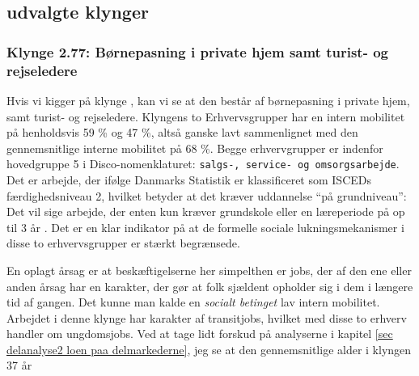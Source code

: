 %
\subsection{udvalgte klynger \label{subsec zoom within.mob}}
%



\subsubsection{Klynge 2.77: Børnepasning i private hjem samt turist- og rejseledere \label{subsubsec zoom 2.77 within.mob}}

Hvis vi kigger på klynge , kan vi se at den består af børnepasning i private hjem, samt turist- og rejseledere. Klyngens to Erhvervsgrupper har en intern mobilitet på henholdsvis  59 \% og 47 \%, altså ganske lavt sammenlignet med den gennemsnitlige interne mobilitet på 68 \%.  Begge erhvervgrupper er indenfor hovedgruppe 5 i Disco-nomenklaturet: \texttt{salgs-, service- og omsorgsarbejde}. Det er arbejde, der ifølge Danmarks Statistik er klassificeret som ISCEDs færdighedsniveau 2, hvilket betyder at det kræver uddannelse “på grundniveau”: Det vil sige arbejde, der enten kun kræver grundskole eller en læreperiode på op til 3 år \parencite[tabel 1]{DSTDISCO88}. Det er en klar indikator på at de formelle sociale lukningsmekanismer i disse to erhvervsgrupper er stærkt begrænsede.


En oplagt årsag er at beskæftigelserne her simpelthen er jobs, der af den ene eller anden årsag har en karakter, der gør at folk sjældent opholder sig i dem i længere tid af gangen. Det kunne man kalde en \emph{socialt betinget} lav intern mobilitet. Arbejdet i denne klynge har karakter af transitjobs, hvilket med disse to erhverv handler om ungdomsjobs. Ved at tage lidt forskud på analyserne i kapitel \ref{sec delanalyse2 loen paa delmarkederne}, jeg se at den gennemsnitlige alder i klyngen 37 år%


